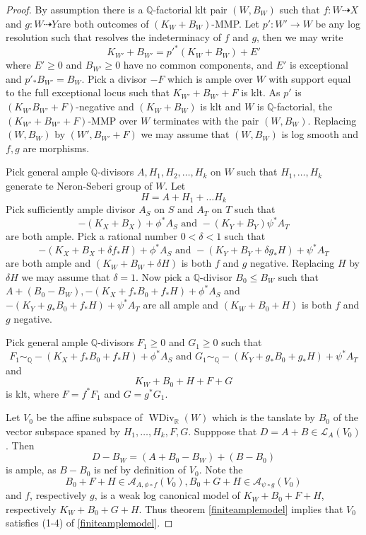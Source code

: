 \documentclass{article}
\begin{document}
\begin{proof}

  By assumption there is a $\mathbb{Q}$-factorial klt pair $(W,B_{W})$ such that $f:W\dashrightarrow X$ and $g:W \dashrightarrow Y$are both outcomes of $(K_{W}+B_{W})$-MMP. Let $p':W'\to W$ be any log resolution such that resolves the indeterminacy of $f$ and $g$, then we may write
  \[
    K_{W'}+B_{W'}=p'^*(K_{W}+B_{W})+E'
  \]
where $E'\geqslant 0$ and $B_{W'}\geqslant 0$ have no common components, and $E'$ is exceptional and $p'_*B_{W'}=B_{W}$. Pick a divisor $-F$ which is ample over $W$ with support equal to the full exceptional locus such that $K_{W'}+B_{W'}+F$ is klt. As $p'$ is $(K_{W'}
B_{W'}+F)$-negative and $(K_{W}+B_{W})$ is klt and $W$ is $\mathbb{Q}$-factorial, the $(K_{W'}+B_{W'}+F)$-MMP over $W$ terminates with the pair $(W,B_{W})$. Replacing $(W,B_{W})$ by $(W',B_{W'} +F)$ we may assume that $(W,B_{W})$ is log smooth and $f,g$ are morphisms.

Pick general ample $\mathbb{Q}$-divisors $A, H_{1},H_{2},\ldots ,H_{k}$ on $W$ such that $H_{1},\ldots , H_{k}$ generate te Neron-Seberi group of $W$. Let 
\[
  H=A+H_{1}+\ldots H_{k}
\]
Pick sufficiently ample divisor $A_{S}$ on $S$ and $A_{T}$ on $T$ such that
\[
-(K_{X}+B_{X})+\phi^*A_{S} \text{ and } -(K_{Y}+B_{Y})\psi^*A_{T}
\]
are both ample. Pick a rational number $0<\delta<1$ such that 
\[
  -(K_{X}+B_{X}+\delta f_*H)+\phi^*A_{S} \text{ and } -(K_{Y}+B_{Y}+\delta g_*H)+\psi^*A_{T}
\]
are both ample and $(K_{W}+B_{W}+\delta H)$ is both  $f$ and  $g$ negative. Replacing $H$ by $\delta H$ we may assume that $\delta=1$. Now pick a $\mathbb{Q}$-divisor $B_{0}\leqslant B_{W}$ such that $A+(B_{0}-B_{W}), -(K_{X}+ f_*B_{0}+f_*H)+\phi^*A_{S}$ and $-(K_{Y}+ g_*B_{0}+f_*H)+\psi^*A_{T}$  are all ample and $(K_{W}+B_{0}+H)$ is both  $f$ and  $g$ negative.

Pick general ample $\mathbb{Q}$-divisors $F_{1}\geqslant 0$ and $G_{1}\geqslant 0$  such that
\[
F_{1}\sim_{\mathbb{Q}} -(K_{X}+f_*B_{0}+ f_*H)+\phi^*A_{S} \text{ and } G_{1}\sim_{\mathbb{Q}} -(K_{Y}+g_*B_{0}+ g_*H)+\psi^*A_{T}
\]
and 
\[
  K_{W}+B_{0}+H+F+G
\]
is klt, where $F=f^*F_{1}$ and $G=g^*G_{1}$. 

Let $V_{0}$ be the affine subspace of $\operatorname{WDiv}_{\mathbb{R}}(W)$ which is the tanslate by $B_{0}$ of the vector subspace  spaned by $H_{1},\ldots , H_{k},F,G$. Supppose that $D=A+B \in \mathcal{L}_{A}(V_{0})$. Then 
\[
  D-B_W=(A+B_{0}-B_{W})+(B-B_{0})
\]
is ample, as $B-B_{0}$ is nef by definition of $V_{0}$. Note the 
\[
  B_{0}+F+H \in \mathcal{A}_{A,\phi\circ f}(V_{0}), B_{0}+G+H \in \mathcal{A}_{\psi \circ g}(V_{0})
\]
and $f$, respectively $g$, is a weak log canonical model of $K_{W}+B_{0}+F+H$, respectively $K_{W}+B_{0}+G+H$. Thus theorem \ref{finiteamplemodel} implies that $V_{0}$ satisfies (1-4) of \ref{finiteamplemodel}.


\end{proof}
\end{document}
